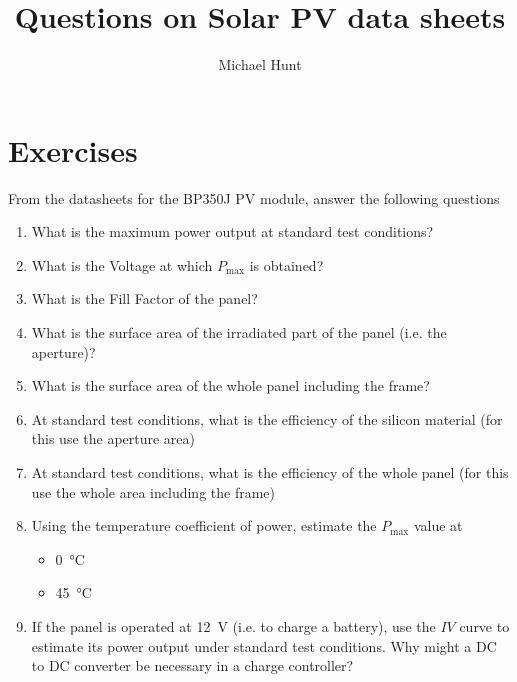 \documentclass{article} %
\title{Questions on Solar PV data sheets}
\author{Michael Hunt}
\date{}
\begin{document}
\maketitle



\section*{Exercises}
\begin{question}\label{qu:ex1}
From the datasheets for the BP350J PV module, answer the following questions
    \begin{enumerate}[label=\alph*)]
    \item	What is the maximum power output at standard test conditions?
    \item	What is the Voltage at which $P_\text{max}$ is obtained?
    \item	What is the Fill Factor of the panel?
    \item	What is the surface area of the irradiated part of the panel (i.e. the aperture)?
    \item	What is the surface area of the whole panel including the frame?
    \item	At standard test conditions, what is the efficiency of the silicon material (for this use the aperture area)
    \item	At standard test conditions, what is the efficiency of the whole panel (for this use the whole area including the frame)
    \item	Using the temperature coefficient of power, estimate the $P_\text{max}$ value at
        \begin{itemize}
        \item	\SI{0}{\celsius}
        \item	\SI{45}{\celsius}
        \end{itemize}
    \item	If the panel is operated at \SI{12}{V} (i.e. to charge a battery), use the $IV$ curve to estimate its power output under standard test conditions. Why might a DC to DC converter be necessary in a charge controller?
    \end{enumerate}
\end{question}
\end{document}
